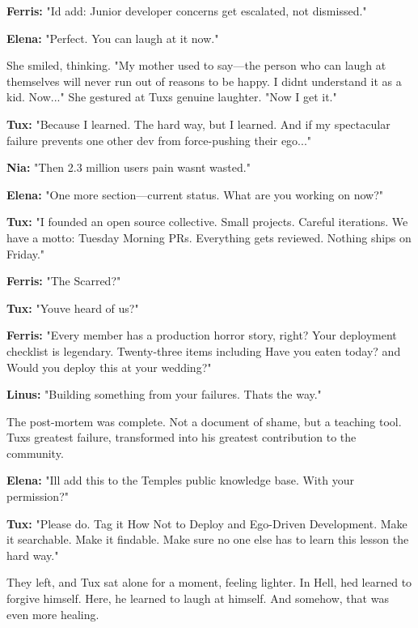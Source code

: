 \textbf{Ferris:} "I\textquotesingle d add: Junior developer concerns get escalated, not dismissed."

\textbf{Elena:} "Perfect. You can laugh at it now."

She smiled, thinking. "My mother used to say---the person who can laugh at themselves will never run out of reasons to be happy. I didn\textquotesingle t understand it as a kid. Now..." She gestured at Tux\textquotesingle s genuine laughter. "Now I get it."

\textbf{Tux:} "Because I learned. The hard way, but I learned. And if my spectacular failure prevents one other dev from force-pushing their ego..."

\textbf{Nia:} "Then 2.3 million users\textquotesingle{} pain wasn\textquotesingle t wasted."

\textbf{Elena:} "One more section---current status. What are you working on now?"

\textbf{Tux:} "I founded an open source collective. Small projects. Careful iterations. We have a motto: \textquotesingle Tuesday Morning PRs.\textquotesingle{} Everything gets reviewed. Nothing ships on Friday."

\textbf{Ferris:} "The Scarred?"

\textbf{Tux:} "You\textquotesingle ve heard of us?"

\textbf{Ferris:} "Every member has a production horror story, right? Your deployment checklist is legendary. Twenty-three items including \textquotesingle Have you eaten today?\textquotesingle{} and \textquotesingle Would you deploy this at your wedding?\textquotesingle"

\textbf{Linus:} "Building something from your failures. That\textquotesingle s the way."

The post-mortem was complete. Not a document of shame, but a teaching tool. Tux\textquotesingle s greatest failure, transformed into his greatest contribution to the community.

\textbf{Elena:} "I\textquotesingle ll add this to the Temple\textquotesingle s public knowledge base. With your permission?"

\textbf{Tux:} "Please do. Tag it \textquotesingle How Not to Deploy\textquotesingle{} and \textquotesingle Ego-Driven Development.\textquotesingle{} Make it searchable. Make it findable. Make sure no one else has to learn this lesson the hard way."

They left, and Tux sat alone for a moment, feeling lighter. In Hell, he\textquotesingle d learned to forgive himself. Here, he learned to laugh at himself. And somehow, that was even more healing.

